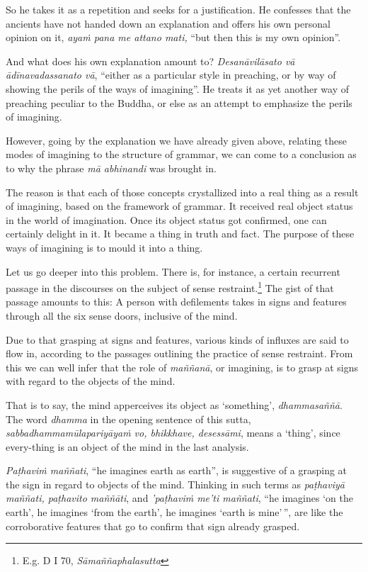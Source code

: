 So he takes it as a repetition and seeks for a justification. He confesses that the ancients have not handed down an explanation and offers his own personal opinion on it, \emph{ayaṁ pana me attano mati,} ``but then this is my own opinion''.

And what does his own explanation amount to? \emph{Desanāvilāsato vā ādīnavadassanato vā}, ``either as a particular style in preaching, or by way of showing the perils of the ways of imagining''. He treats it as yet another way of preaching peculiar to the Buddha, or else as an attempt to emphasize the perils of imagining.

However, going by the explanation we have already given above, relating these modes of imagining to the structure of grammar, we can come to a conclusion as to why the phrase \emph{mā abhinandi} was brought in.

The reason is that each of those concepts crystallized into a real thing as a result of imagining, based on the framework of grammar. It received real object status in the world of imagination. Once its object status got confirmed, one can certainly delight in it. It became a thing in truth and fact. The purpose of these ways of imagining is to mould it into a thing.

Let us go deeper into this problem. There is, for instance, a certain recurrent passage in the discourses on the subject of sense restraint.\footnote{E.g. D I 70, \emph{Sāmaññaphalasutta}} The gist of that passage amounts to this: A person with defilements takes in signs and features through all the six sense doors, inclusive of the mind.

Due to that grasping at signs and features, various kinds of influxes are said to flow in, according to the passages outlining the practice of sense restraint. From this we can well infer that the role of \emph{maññanā}, or imagining, is to grasp at signs with regard to the objects of the mind.

That is to say, the mind apperceives its object as `something', \emph{dhammasaññā}. The word \emph{dhamma} in the opening sentence of this sutta, \emph{sabbadhammamūlapariyāyaṁ vo, bhikkhave, desessāmi}, means a `thing', since every-thing is an object of the mind in the last analysis.

\emph{Paṭhaviṁ maññati}, ``he imagines earth as earth'', is suggestive of a grasping at the sign in regard to objects of the mind. Thinking in such terms as \emph{paṭhaviyā maññati, paṭhavito maññāti}, and \emph{'paṭhaviṁ me'ti maññati}, ``he imagines `on the earth', he imagines `from the earth', he imagines `earth is mine'\,'', are like the corroborative features that go to confirm that sign already grasped.


